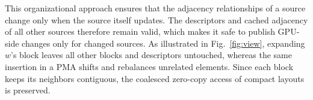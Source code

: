 This organizational approach ensures that the adjacency relationships of a source change only when the source itself updates. The descriptors and cached adjacency of all other sources therefore remain valid, which makes it safe to publish GPU-side changes only for changed sources. As illustrated in Fig.~\ref{fig:view}, expanding $w$'s block leaves all other blocks and descriptors untouched, whereas the same insertion in a PMA shifts and rebalances unrelated  elements. Since each block keeps its neighbors contiguous, the coalesced zero-copy access of compact layouts is preserved.




